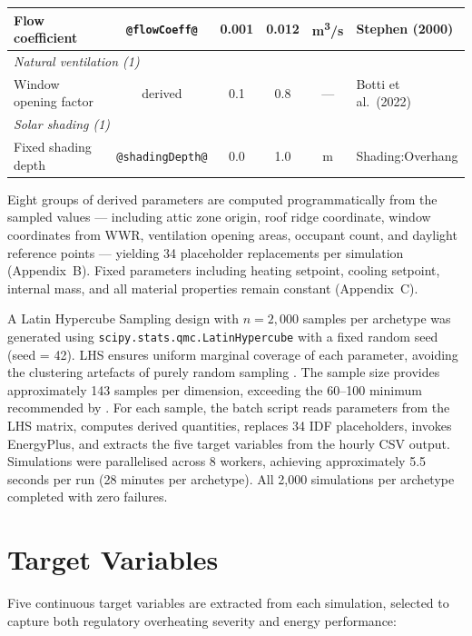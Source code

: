 \documentclass[12pt,a4paper]{report}
\begin{document}
\begin{table}[htbp]
\begin{tabularx}{\textwidth}{lccccX}
Flow coefficient    & \texttt{@flowCoeff@}          & 0.001 & 0.012 & m\textsuperscript{3}/s & Stephen (2000) \\
\midrule
\multicolumn{6}{l}{\textit{Natural ventilation (1)}} \\
Window opening factor & derived                     & 0.1   & 0.8   & ---     & Botti et al.\ (2022) \\
\midrule
\multicolumn{6}{l}{\textit{Solar shading (1)}} \\
Fixed shading depth & \texttt{@shadingDepth@}       & 0.0   & 1.0   & m       & Shading:Overhang \\
\bottomrule
\end{tabularx}
\end{table}

Eight groups of derived parameters are computed programmatically from the sampled values --- including attic zone origin, roof ridge coordinate, window coordinates from WWR, ventilation opening areas, occupant count, and daylight reference points --- yielding 34 placeholder replacements per simulation (Appendix~B). Fixed parameters including heating setpoint, cooling setpoint, internal mass, and all material properties remain constant (Appendix~C).

A Latin Hypercube Sampling design with $n = 2{,}000$ samples per archetype was generated using \texttt{scipy.stats.qmc.LatinHypercube} with a fixed random seed (seed = 42). LHS ensures uniform marginal coverage of each parameter, avoiding the clustering artefacts of purely random sampling \citep{Westermann2019}. The sample size provides approximately 143 samples per dimension, exceeding the 60--100 minimum recommended by \citet{Lomas1992}. For each sample, the batch script reads parameters from the LHS matrix, computes derived quantities, replaces 34 IDF placeholders, invokes EnergyPlus, and extracts the five target variables from the hourly CSV output. Simulations were parallelised across 8 workers, achieving approximately 5.5 seconds per run (28 minutes per archetype). All 2{,}000 simulations per archetype completed with zero failures.


\section{Target Variables}
\label{sec:targets}

Five continuous target variables are extracted from each simulation, selected to capture both regulatory overheating severity and energy performance:
\end{document}
